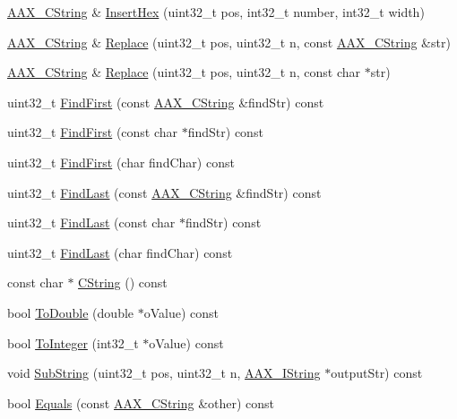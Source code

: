 \begin{DoxyCompactItemize}
\item 
\hyperlink{a00042}{A\+A\+X\+\_\+\+C\+String} \& \hyperlink{a00042_a997f5d35fe26da01fcd895d642a93c2e}{Insert\+Hex} (uint32\+\_\+t pos, int32\+\_\+t number, int32\+\_\+t width)
\item 
\hyperlink{a00042}{A\+A\+X\+\_\+\+C\+String} \& \hyperlink{a00042_a5c9ce66b740633bf47505a3129e557c2}{Replace} (uint32\+\_\+t pos, uint32\+\_\+t n, const \hyperlink{a00042}{A\+A\+X\+\_\+\+C\+String} \&str)
\item 
\hyperlink{a00042}{A\+A\+X\+\_\+\+C\+String} \& \hyperlink{a00042_a0042478ce045fd36b91a7cfc1122ffb6}{Replace} (uint32\+\_\+t pos, uint32\+\_\+t n, const char $\ast$str)
\item 
uint32\+\_\+t \hyperlink{a00042_ad09b3b479c72812c3b3ecbb0531856ea}{Find\+First} (const \hyperlink{a00042}{A\+A\+X\+\_\+\+C\+String} \&find\+Str) const 
\item 
uint32\+\_\+t \hyperlink{a00042_ad526e686544aba0ebec49abd3cc46ede}{Find\+First} (const char $\ast$find\+Str) const 
\item 
uint32\+\_\+t \hyperlink{a00042_a32708c0433461848c01e29c956c3deb7}{Find\+First} (char find\+Char) const 
\item 
uint32\+\_\+t \hyperlink{a00042_a2e4de3781d424e17b1c5773887c0f805}{Find\+Last} (const \hyperlink{a00042}{A\+A\+X\+\_\+\+C\+String} \&find\+Str) const 
\item 
uint32\+\_\+t \hyperlink{a00042_aaf25b0ada50d58a795c4407f173b8758}{Find\+Last} (const char $\ast$find\+Str) const 
\item 
uint32\+\_\+t \hyperlink{a00042_a5a76c8c89b46059d95fa677f0abf5d5e}{Find\+Last} (char find\+Char) const 
\item 
const char $\ast$ \hyperlink{a00042_abebd10e42f859dd4a986551e47dfd9c5}{C\+String} () const 
\item 
bool \hyperlink{a00042_a43f9f9e538c2da819b731de9de9b7db0}{To\+Double} (double $\ast$o\+Value) const 
\item 
bool \hyperlink{a00042_a1c22f5fd87d916ab2c655e8ee2783c25}{To\+Integer} (int32\+\_\+t $\ast$o\+Value) const 
\item 
void \hyperlink{a00042_a4247c1ab096405732f5d2ce39e0bc47a}{Sub\+String} (uint32\+\_\+t pos, uint32\+\_\+t n, \hyperlink{a00113}{A\+A\+X\+\_\+\+I\+String} $\ast$output\+Str) const 
\item 
bool \hyperlink{a00042_a701d4edeef3ccf5f1820e190807ef53e}{Equals} (const \hyperlink{a00042}{A\+A\+X\+\_\+\+C\+String} \&other) const 
\item 

\end{DoxyCompactItemize}
